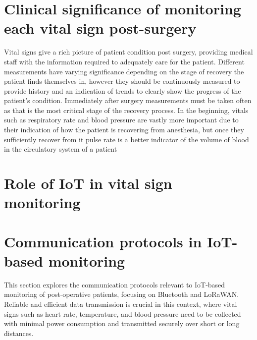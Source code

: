 \section{Clinical significance of monitoring each vital sign post-surgery} %
Vital signs give a rich picture of patient condition post surgery, providing medical staff with the information required to adequately care for the patient. Different measurements have varying significance depending on the stage of recovery the patient finds themselves in, however they should be continuously measured to provide history and an indication of trends to clearly show the progress of the patient's condition. Immediately after surgery measurements must be taken often as that is the most critical stage of the recovery process. In the beginning, vitals such as respiratory rate and blood pressure are vastly more important due to their indication of how the patient is recovering from anesthesia, but once they sufficiently recover from it pulse rate is a better indicator of the volume of blood in the circulatory system of a patient \cite{Surwit_Tam_2008}


\section{Role of IoT in vital sign monitoring} %
\section{Communication protocols in IoT-based monitoring} %
This section explores the communication protocols relevant to IoT-based monitoring of post-operative patients, focusing on Bluetooth and LoRaWAN. Reliable and efficient data transmission is crucial in this context, where vital signs such as heart rate, temperature, and blood pressure need to be collected with minimal power consumption and transmitted securely over short or long distances.

